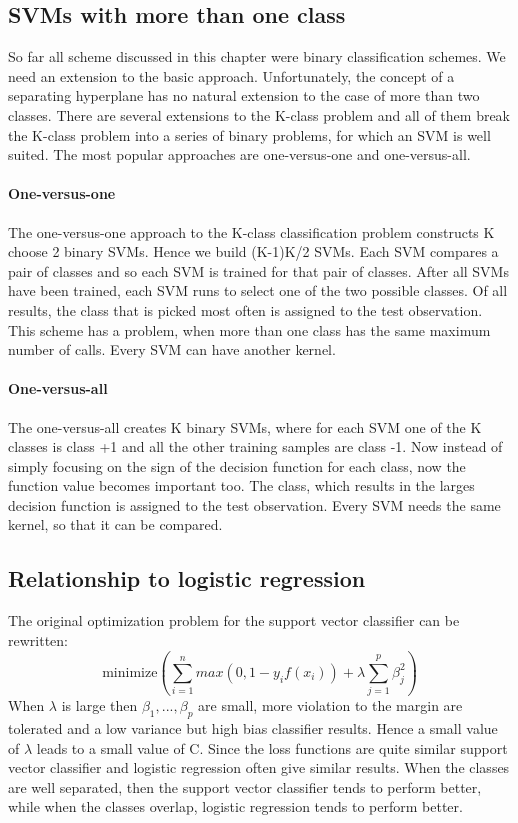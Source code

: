 \documentclass[../document.tex]{subfiles}
\begin{document}
	\subsection{SVMs with more than one class}
	So far all scheme discussed in this chapter were binary classification schemes. We need an extension to the basic approach. Unfortunately, the concept of a separating hyperplane has no natural extension to the case of more than two classes. There are several extensions to the K-class problem and all of them break the K-class problem into a series of binary problems, for which an SVM is well suited. The most popular approaches are one-versus-one and one-versus-all.

	\paragraph{One-versus-one}
	The one-versus-one approach to the K-class classification problem constructs K choose 2 binary SVMs. Hence we build (K-1)K/2 SVMs. Each SVM compares a pair of classes and so each SVM is trained for that pair of classes. After all SVMs have been trained, each SVM runs to select one of the two possible classes. Of all results, the class that is picked most often is assigned to the test observation. This scheme has a problem, when more than one class has the same maximum number of calls. Every SVM can have another kernel.

	\paragraph{One-versus-all}
	The one-versus-all creates K binary SVMs, where for each SVM one of the K classes is class +1 and all the other training samples are class -1. Now instead of simply focusing on the sign of the decision function for each class, now the function value becomes important too. The class, which results in the larges decision function is assigned to the test observation. Every SVM needs the same kernel, so that it can be compared.

	\subsection{Relationship to logistic regression}
	The original optimization problem for the support vector classifier can be rewritten:
	\begin{equation}
		\text{minimize}(\sum_{i=1}^{n}max(0,1-y_{i}f(x_{i}))+\lambda\sum_{j=1}^{p}\beta_{j}^2)
	\end{equation}
	When $\lambda$ is large then $\beta_{1},...,\beta_{p}$ are small, more violation to the margin are tolerated and a low variance but high bias classifier results. Hence a small value of $\lambda$ leads to a small value of C. Since the loss functions are quite similar support vector classifier and logistic regression often give similar results. When the classes are well separated, then the support vector classifier tends to perform better, while when the classes overlap, logistic regression tends to perform better.
\end{document}
